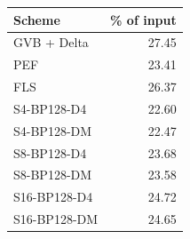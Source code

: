 \begin{tabular}{lr}
\toprule
Scheme & \% of input \\
\midrule
GVB + Delta & 27.45 \\
PEF & 23.41 \\
FLS & 26.37 \\
S4-BP128-D4 & 22.60 \\
S4-BP128-DM & 22.47 \\
S8-BP128-D4 & 23.68 \\
S8-BP128-DM & 23.58 \\
S16-BP128-D4 & 24.72 \\
S16-BP128-DM & 24.65 \\
\bottomrule
\end{tabular}
